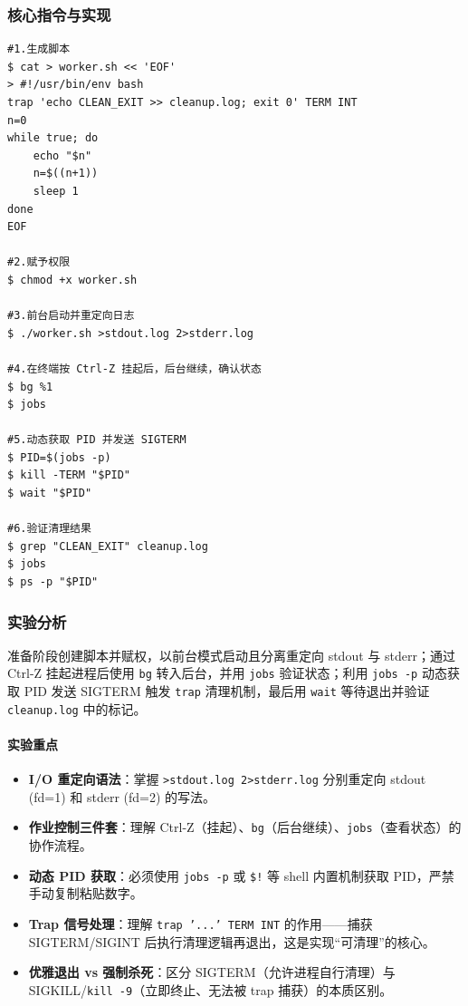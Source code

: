 \documentclass[12pt,a4paper]{article}
\begin{document}
\subsubsection{核心指令与实现}
\begin{lstlisting}[caption={实验一关键 Shell 指令}]
#1.生成脚本
$ cat > worker.sh << 'EOF'
> #!/usr/bin/env bash
trap 'echo CLEAN_EXIT >> cleanup.log; exit 0' TERM INT
n=0
while true; do
    echo "$n"
    n=$((n+1))
    sleep 1
done
EOF

#2.赋予权限
$ chmod +x worker.sh

#3.前台启动并重定向日志
$ ./worker.sh >stdout.log 2>stderr.log

#4.在终端按 Ctrl-Z 挂起后，后台继续，确认状态
$ bg %1  
$ jobs 

#5.动态获取 PID 并发送 SIGTERM
$ PID=$(jobs -p)
$ kill -TERM "$PID"
$ wait "$PID" 

#6.验证清理结果
$ grep "CLEAN_EXIT" cleanup.log
$ jobs 
$ ps -p "$PID"  
\end{lstlisting}

\subsubsection{实验分析}
\begin{infobox}[实现思路]
准备阶段创建脚本并赋权，以前台模式启动且分离重定向 stdout 与 stderr；通过 Ctrl-Z 挂起进程后使用 \texttt{bg} 转入后台，并用 \texttt{jobs} 验证状态；利用 \texttt{jobs -p} 动态获取 PID 发送 SIGTERM 触发 \texttt{trap} 清理机制，最后用 \texttt{wait} 等待退出并验证 \texttt{cleanup.log} 中的标记。
\end{infobox}
\paragraph{实验重点}
\begin{itemize}[leftmargin=2em]
    \item \textbf{I/O 重定向语法}：掌握 \texttt{>stdout.log 2>stderr.log} 分别重定向 stdout (fd=1) 和 stderr (fd=2) 的写法。
    \item \textbf{作业控制三件套}：理解 Ctrl-Z（挂起）、\texttt{bg}（后台继续）、\texttt{jobs}（查看状态）的协作流程。
    \item \textbf{动态 PID 获取}：必须使用 \texttt{jobs -p} 或 \texttt{\$!} 等 shell 内置机制获取 PID，严禁手动复制粘贴数字。
    \item \textbf{Trap 信号处理}：理解 \texttt{trap '...' TERM INT} 的作用——捕获 SIGTERM/SIGINT 后执行清理逻辑再退出，这是实现“可清理”的核心。
    \item \textbf{优雅退出 vs 强制杀死}：区分 SIGTERM（允许进程自行清理）与 SIGKILL/\texttt{kill -9}（立即终止、无法被 trap 捕获）的本质区别。
\end{itemize}
\end{document}
